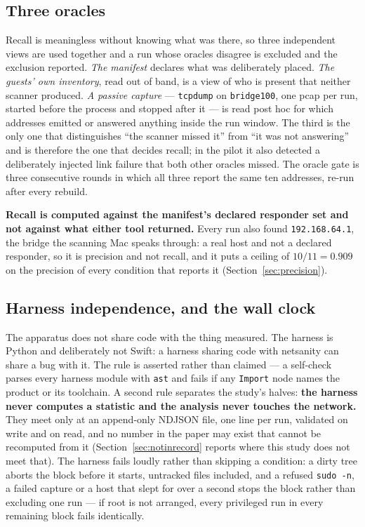 \documentclass[conference]{IEEEtran}
\newcommand{\netsanity}{\textsf{netsanity}}
\begin{document}
\subsection{Three oracles}
\label{sec:oracles}

Recall is meaningless without knowing what was there, so three independent
views are used together and a run whose oracles disagree is excluded and the
exclusion reported. \emph{The manifest} declares what was deliberately placed.
\emph{The guests' own inventory}, read out of band, is a view of who is present
that neither scanner produced. \emph{A passive capture} --- \texttt{tcpdump} on
\texttt{bridge100}, one pcap per run, started before the process and stopped
after it --- is read post hoc for which addresses emitted or answered anything
inside the run window. The third is the only one that distinguishes ``the
scanner missed it'' from ``it was not answering'' and is therefore the one that
decides recall; in the pilot it also detected a deliberately injected link
failure that both other oracles missed. The oracle gate is three consecutive
rounds in which all three report the same ten addresses, re-run after every
rebuild.

\textbf{Recall is computed against the manifest's declared responder set and
not against what either tool returned.} Every run also found
\texttt{192.168.64.1}, the bridge the scanning Mac speaks through: a real host
and not a declared responder, so it is precision and not recall, and it puts a
ceiling of $10/11=0.909$ on the precision of every condition that reports it
(Section~\ref{sec:precision}).

\subsection{Harness independence, and the wall clock}
\label{sec:independence}

The apparatus does not share code with the thing measured. The harness is
Python and deliberately not Swift: a harness sharing code with \netsanity{} can
share a bug with it. The rule is asserted rather than claimed --- a self-check
parses every harness module with \texttt{ast} and fails if any \texttt{Import}
node names the product or its toolchain. A second rule separates the study's
halves: \textbf{the harness never computes a statistic and the analysis never
touches the network.} They meet only at an append-only NDJSON file, one line
per run, validated on write and on read, and no number in the paper may exist
that cannot be recomputed from it (Section~\ref{sec:notinrecord} reports where
this study does not meet that). The harness fails loudly rather than skipping a
condition: a dirty tree aborts the block before it starts, untracked files
included, and a refused \texttt{sudo -n}, a failed capture or a host that slept
for over a second stops the block rather than excluding one run --- if root is
not arranged, every privileged run in every remaining block fails identically.
\end{document}
